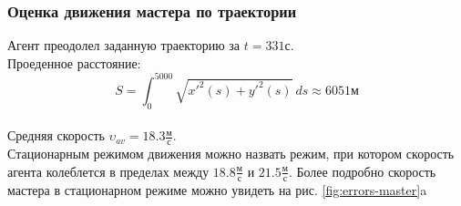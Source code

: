 \documentclass[12pt,a4paper]{article}
\begin{document}
\subsubsection{Оценка движения мастера по траектории}
Агент преодолел заданную траекторию за $t = 331 \text{с}$. \\
Проеденное расстояние:
$$ S = \int_{0}^{5000} \sqrt{x'^2(s) + y'^2(s)} \ ds \approx 6051 \text{м} $$ \\
Средняя скорость $\upsilon_{av} = 18.3  \frac{\text{м}}{\text{с}}$. \\
Стационарным режимом движения можно назвать режим, при котором скорость агента колеблется в пределах между $18.8\frac{\text{м}}{\text{с}}$ и $21.5\frac{\text{м}}{\text{с}}$. Более подробно скорость мастера в стационарном режиме можно увидеть на рис. \ref{fig:errors-master}a \\
\end{document}
